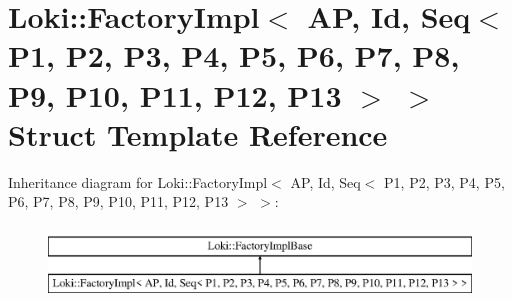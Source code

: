 \hypertarget{structLoki_1_1FactoryImpl_3_01AP_00_01Id_00_01Seq_3_01P1_00_01P2_00_01P3_00_01P4_00_01P5_00_01P627427229cbdd523be62dd804a58aab17}{}\section{Loki\+:\+:Factory\+Impl$<$ A\+P, Id, Seq$<$ P1, P2, P3, P4, P5, P6, P7, P8, P9, P10, P11, P12, P13 $>$ $>$ Struct Template Reference}
\label{structLoki_1_1FactoryImpl_3_01AP_00_01Id_00_01Seq_3_01P1_00_01P2_00_01P3_00_01P4_00_01P5_00_01P627427229cbdd523be62dd804a58aab17}
Inheritance diagram for Loki\+:\+:Factory\+Impl$<$ A\+P, Id, Seq$<$ P1, P2, P3, P4, P5, P6, P7, P8, P9, P10, P11, P12, P13 $>$ $>$\+:\begin{figure}[H]
\begin{center}
\leavevmode
\includegraphics[height=2.000000cm]{structLoki_1_1FactoryImpl_3_01AP_00_01Id_00_01Seq_3_01P1_00_01P2_00_01P3_00_01P4_00_01P5_00_01P627427229cbdd523be62dd804a58aab17}
\end{center}
\end{figure}
